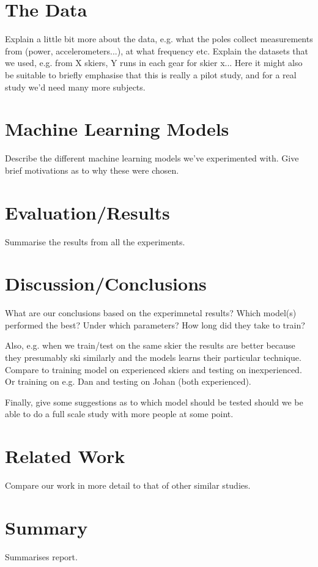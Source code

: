 \documentclass[11pt]{article}
\begin{document}
\section{The Data}
Explain a little bit more about the data, e.g. what the poles collect measurements from (power, accelerometers...), at what frequency etc. 
Explain the datasets that we used, e.g. from X skiers, Y runs in each gear for skier x... 
Here it might also be suitable to briefly emphasise that this is really a pilot study, and for a real study we'd need many more subjects.

\section{Machine Learning Models}
Describe the different machine learning models we've experimented with. Give brief motivations as to why these were chosen.

\section{Evaluation/Results}
Summarise the results from all the experiments.

\section{Discussion/Conclusions}
What are our conclusions based on the experimnetal results? Which model(s) performed the best? Under which parameters? How long did they take to train? 

Also, e.g. when we train/test on the same skier the results are better because they presumably ski similarly and the models learns their particular technique. Compare to training model on experienced skiers and testing on inexperienced. Or training on e.g. Dan and testing on Johan (both experienced). 

Finally, give some suggestions as to which model should be tested should we be able to do a full scale study with more people at some point.

\section{Related Work}
Compare our work in more detail to that of other similar studies.

\section{Summary}
Summarises report.
\end{document}
